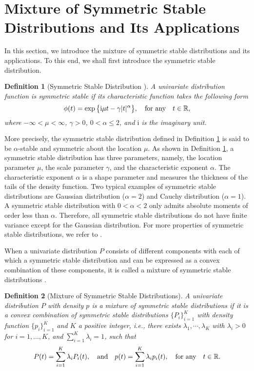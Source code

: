 \documentclass[11pt]{article}
\newtheorem{definition}{Definition}
\begin{document}
\section{Mixture of Symmetric Stable Distributions and Its Applications}\label{sec::mixture_stable_noise}
In this section, we introduce the mixture of symmetric stable distributions and its applications.  To this end, we shall first introduce the symmetric stable distribution.

\begin{definition}[Symmetric Stable Distribution \cite{samorodnitsky1994stable}]\label{definition-symmetric_stable}
	A univariate distribution function is symmetric stable if its characteristic function takes the following form
	\begin{align*}
	\phi(t)=\exp\big\{\mathrm{i}\mu t-\gamma|t|^\alpha\big\},\quad \hbox{for any}\quad t\in\mathbb{R},
	\end{align*}
	where $-\infty<\mu<\infty$, $\gamma>0$, $0<\alpha\leq 2$, and $\mathrm{i}$ is the imaginary unit.
\end{definition}

More precisely, the symmetric stable distribution defined in Definition \ref{definition-symmetric_stable} is said to be $\alpha$-stable and symmetric about the location $\mu$. As shown in Definition \ref{definition-symmetric_stable}, a symmetric stable distribution has three parameters, namely, the location parameter $\mu$, the scale parameter $\gamma$, and the characteristic exponent $\alpha$. The characteristic exponent $\alpha$ is a shape parameter and measures the thickness of the tails of the density function. Two typical examples of symmetric stable distributions are Gaussian distribution ($\alpha=2$) and Cauchy distribution ($\alpha=1$). A symmetric stable distribution with $0<\alpha<2$ only admits absolute moments of order less than $\alpha$. Therefore, all symmetric stable distributions do not have finite variance except for the Gaussian distribution. For more properties of symmetric stable distributions, we refer to \cite{fama1968some,miller1978properties,samorodnitsky1994stable}.    


When a univariate distribution $P$ consists of different components with each of which a symmetric stable distribution and can be expressed as a convex combination of these components, it is called a mixture of symmetric stable distributions \cite{mclachlan1988mixture}.  

\begin{definition}[Mixture of Symmetric Stable Distributions]\label{mixture_definition-symmetric_stable}
A univariate distribution $P$ with density $p$ is a mixture of symmetric stable distributions if it is a convex combination of symmetric stable distributions $\{P_i\}_{i=1}^K$ with density function $\{p_i\}_{i=1}^K$ and $K$ a positive integer, i.e., there exists $\lambda_1,\cdots,\lambda_K$ with $\lambda_i> 0$ for $i=1,\ldots,K$, and $\sum_{i=1}^K\lambda_i=1$, such that
	\begin{align*}
	P(t)=\sum_{i=1}^K \lambda_i P_i(t), \quad \hbox{and} \quad p(t)=\sum_{i=1}^K \lambda_i p_i(t), \quad\hbox{for any}\quad t\in\mathbb{R}.
	\end{align*} 
\end{definition}
\end{document}
